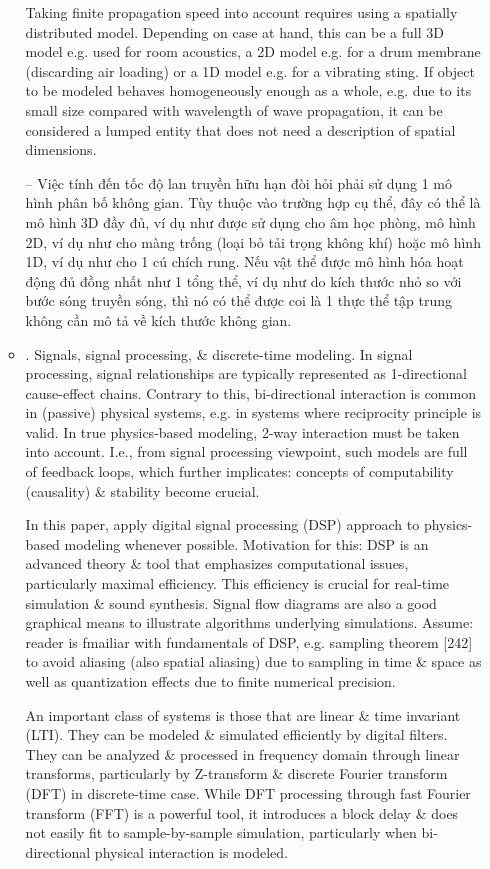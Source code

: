 \documentclass{article}
\begin{document}
\begin{itemize}
\begin{itemize}
		Taking finite propagation speed into account requires using a spatially distributed model. Depending on case at hand, this can be a full 3D model e.g. used for room acoustics, a 2D model e.g. for a drum membrane (discarding air loading) or a 1D model e.g. for a vibrating sting. If object to be modeled behaves homogeneously enough as a whole, e.g. due to its small size compared with wavelength of wave propagation, it can be considered a lumped entity that does not need a description of spatial dimensions.
		
		-- Việc tính đến tốc độ lan truyền hữu hạn đòi hỏi phải sử dụng 1 mô hình phân bố không gian. Tùy thuộc vào trường hợp cụ thể, đây có thể là mô hình 3D đầy đủ, ví dụ như được sử dụng cho âm học phòng, mô hình 2D, ví dụ như cho màng trống (loại bỏ tải trọng không khí) hoặc mô hình 1D, ví dụ như cho 1 cú chích rung. Nếu vật thể được mô hình hóa hoạt động đủ đồng nhất như 1 tổng thể, ví dụ như do kích thước nhỏ so với bước sóng truyền sóng, thì nó có thể được coi là 1 thực thể tập trung không cần mô tả về kích thước không gian.
		\item {. Signals, signal processing, \& discrete-time modeling.} In signal processing, signal relationships are typically represented as 1-directional cause-effect chains. Contrary to this, bi-directional interaction is common in (passive) physical systems, e.g. in systems where reciprocity principle is valid. In true physics-based modeling, 2-way interaction must be taken into account. I.e., from signal processing viewpoint, such models are full of feedback loops, which further implicates: concepts of computability (causality) \& stability become crucial.
		
		In this paper, apply digital signal processing (DSP) approach to physics-based modeling whenever possible. Motivation for this: DSP is an advanced theory \& tool that emphasizes computational issues, particularly maximal efficiency. This efficiency is crucial for real-time simulation \& sound synthesis. Signal flow diagrams are also a good graphical means to illustrate algorithms underlying simulations. Assume: reader is fmailiar with fundamentals of DSP, e.g. sampling theorem [242] to avoid aliasing (also spatial aliasing) due to sampling in time \& space as well as quantization effects due to finite numerical precision.
		
		An important class of systems is those that are linear \& time invariant (LTI). They can be modeled \& simulated efficiently by digital filters. They can be analyzed \& processed in frequency domain through linear transforms, particularly by Z-transform \& discrete Fourier transform (DFT) in discrete-time case. While DFT processing through fast Fourier transform (FFT) is a powerful tool, it introduces a block delay \& does not easily fit to sample-by-sample simulation, particularly when bi-directional physical interaction is modeled.
		

\end{itemize}
\end{itemize}
\end{document}
